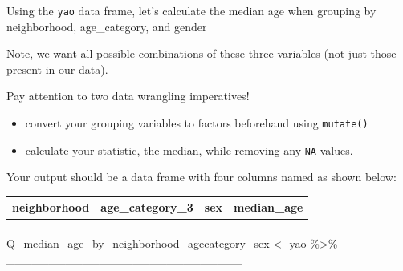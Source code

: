 \documentclass[
  letterpaper,
  DIV=11,
  numbers=noendperiod]{scrreprt}
\newenvironment{Shaded}{\begin{snugshade}}{\end{snugshade}}
\newcommand{\NormalTok}[1]{\textcolor[rgb]{0.00,0.23,0.31}{#1}}
\newcommand{\OtherTok}[1]{\textcolor[rgb]{0.00,0.23,0.31}{#1}}
\newcommand{\SpecialCharTok}[1]{\textcolor[rgb]{0.37,0.37,0.37}{#1}}
\providecommand{\tightlist}{%
  \setlength{\itemsep}{0pt}\setlength{\parskip}{0pt}}\usepackage{longtable,booktabs,array}
\begin{document}
\begin{tcolorbox}[enhanced jigsaw, titlerule=0mm, colback=white, left=2mm, breakable, opacitybacktitle=0.6, colbacktitle=quarto-callout-tip-color!10!white, colframe=quarto-callout-tip-color-frame, bottomtitle=1mm, opacityback=0, coltitle=black, arc=.35mm, toptitle=1mm, title=\textcolor{quarto-callout-tip-color}{\faLightbulb}\hspace{0.5em}{Practice}, leftrule=.75mm, toprule=.15mm, bottomrule=.15mm, rightrule=.15mm]

Using the \texttt{yao} data frame, let's calculate the median age when
grouping by neighborhood, age\_category, and gender

Note, we want all possible combinations of these three variables (not
just those present in our data).

Pay attention to two data wrangling imperatives!

\begin{itemize}
\tightlist
\item
  convert your grouping variables to factors beforehand using
  \texttt{mutate()}
\item
  calculate your statistic, the median, while removing any \texttt{NA}
  values.
\end{itemize}

Your output should be a data frame with four columns named as shown
below:

\begin{longtable}[]{@{}llll@{}}
\toprule\noalign{}
neighborhood & age\_category\_3 & sex & median\_age \\
\midrule\noalign{}
\endhead
\bottomrule\noalign{}
\endlastfoot
& & & \\
\end{longtable}

\begin{Shaded}
\begin{Highlighting}[]
\NormalTok{Q\_median\_age\_by\_neighborhood\_agecategory\_sex }\OtherTok{\textless{}{-}} 
\NormalTok{  yao }\SpecialCharTok{\%\textgreater{}\%}
\NormalTok{  \_\_\_\_\_\_\_\_\_\_\_\_\_\_\_\_\_\_\_\_\_\_\_\_\_\_\_\_}
\end{Highlighting}
\end{Shaded}

\end{tcolorbox}
\end{document}
